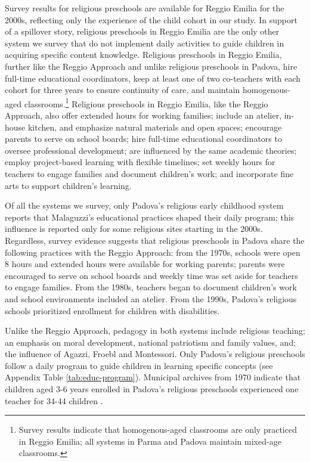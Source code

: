 Survey results for religious preschools are available for Reggio Emilia for the 2000s, reflecting only the experience of the child cohort in our study. In support of a spillover story, religious preschools in Reggio Emilia are the only other system we survey that do not implement daily activities to guide children in acquiring specific content knowledge. Religious preschools in Reggio Emilia, further like the Reggio Approach and unlike religious preschools in Padova, hire full-time educational coordinators, keep at least one of two co-teachers with each cohort for three years to ensure continuity of care, and maintain homogenous-aged classrooms.\footnote{Survey results indicate that homogenous-aged classrooms are only practiced in Reggio Emilia; all systems in Parma and Padova maintain mixed-age classrooms.} Religious preschools in Reggio Emilia, like the Reggio Approach, also offer extended hours for working families; include an atelier, in-house kitchen, and emphasize natural materials and open spaces; encourage parents to serve on school boards; hire full-time educational coordinators to oversee professional development; are influenced by the same academic theories; employ project-based learning with flexible timelines; set weekly hours for teachers to engage families and document children's work; and incorporate fine arts to support children's learning. 

Of all the systems we survey, only Padova's religious early childhood system reports that Malaguzzi's educational practices shaped their daily program; this influence is reported only for some religious sites starting in the 2000s. Regardless, survey evidence suggests that religious preschools in Padova share the following practices with the Reggio Approach: from the 1970s, schools were open 8 hours and extended hours were available for working parents; parents were encouraged to serve on school boards and weekly time was set aside for teachers to engage families. From the 1980s, teachers began to document children's work and school environments included an atelier. From the 1990s, Padova's religious schools prioritized enrollment for children with disabilities. 

Unlike the Reggio Approach, pedagogy in both systems include religious teaching; an emphasis on moral development, national patriotism and family values, and; the influence of Agazzi, Froebl and Montessori. Only Padova's religious preschools follow a daily program to guide children in learning specific concepts (see Appendix Table \ref{tab:educ-program}). Municipal archives from 1970 indicate that children aged 3-6 years enrolled in Padova's religious preschools experienced one teacher for 34-44 children \citep{Padova-Admin-Data_1964-2011}. 

